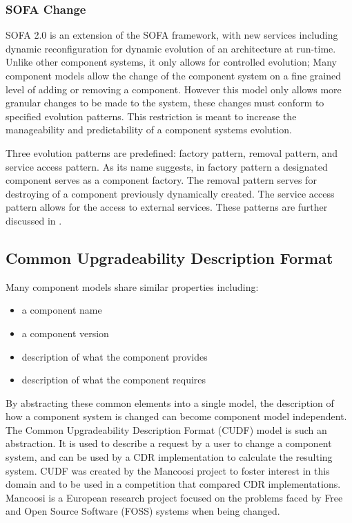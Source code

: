 \subsubsection{SOFA Change}
SOFA 2.0 is an extension of the SOFA framework, with new services including dynamic reconfiguration for dynamic evolution of an architecture at run-time. 
Unlike other component systems,
it only allows for controlled evolution; 
Many component models allow the change of the component system on a fine grained level of adding or removing a component.
However this model only allows more granular changes to be made to the system, these changes must conform to specified evolution patterns.
This restriction is meant to increase the manageability and predictability of a component systems evolution. 

Three evolution patterns are predefined: factory pattern, removal pattern, and service access pattern.
As its name suggests, in factory pattern a designated component serves as a component factory. 
The removal pattern serves for destroying of a component previously dynamically created.
The service access pattern allows for the access to external services.
These patterns are further discussed in \citep{Hnetynka2006}.


\subsection{Common Upgradeability Description Format}
Many component models share similar properties including:
\begin{itemize}
  \item a component name
  \item a component version
  \item description of what the component provides
  \item description of what the component requires
\end{itemize} 

By abstracting these common elements into a single model, the description of how a component system is changed can become component model independent.
The Common Upgradeability Description Format (CUDF) model is such an abstraction.
It is used to describe a request by a user to change a component system, and can be used by a CDR implementation to calculate the resulting system.
CUDF was created by the Mancoosi project to foster interest in this domain and to be used in a competition that compared CDR implementations.
Mancoosi is a European research project focused on the problems faced by Free and Open Source Software (FOSS) systems when being changed.

